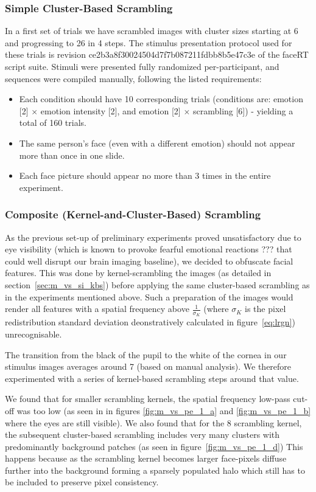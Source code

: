	    \subsubsection{Simple Cluster-Based Scrambling}
	    In a first set of trials we have scrambled images with cluster sizes starting at \SI{6}{\pixel} and progressing to \SI{26}{\pixel} in \SI{4}{\pixel} steps.
	    The stimulus presentation protocol used for these trials is revision \textcolor{lg}{ce2b3a8f30024504d7f7b087211fdbb8b5e47c3e} of the faceRT\cite{faceRT} script suite.
	    Stimuli were presented fully randomized per-participant, and sequences were compiled manually, following the listed requirements:
	    \begin{itemize}
		\item Each condition should have 10 corresponding trials (conditions are: emotion [2] $\times$ emotion intensity [2], and emotion [2] $\times$ scrambling [6]) - yielding a total of 160 trials.
		\item The same person's face (even with a different emotion) should not appear more than once in one slide.
		\item Each face picture should appear no more than 3 times in the entire experiment.
	    \end{itemize}
	    \subsubsection{Composite (Kernel-and-Cluster-Based) Scrambling}
	    As the previous set-up of preliminary experiments proved unsatisfactory due to eye visibility (which is known to provoke fearful emotional reactions ??? that could well disrupt our brain imaging baseline), we decided to obfuscate facial features.
	    This was done by kernel-scrambling the images (as detailed in section~\ref{sec:m_vs_si_kbs}) before applying the same cluster-based scrambling as in the experiments mentioned above.
	    Such a preparation of the images would render all features with a spatial frequency above $\frac{1}{\sigma_{K}}$ (where $\sigma_{K}$ is the pixel redistribution standard deviation deonstratively calculated in figure~\ref{eq:lrgn}) unrecognisable.
	    
	    The transition from the black of the pupil to the white of the cornea in our stimulus images averages around \SI{7}{\pixel} (based on manual analysis).
	    We therefore experimented with a series of kernel-based scrambling steps around that value.
	    
	    We found that for smaller scrambling kernels, the spatial frequency low-pass cut-off was too low (as seen in in figures \ref{fig:m_vs_pe_1_a} and \ref{fig:m_vs_pe_1_b} where the eyes are still visible).
	    We also found that for the \SI{8}{\pixel} scrambling kernel, the subsequent cluster-based scrambling includes very many clusters with predominantly background patches (as seen in figure~\ref{fig:m_vs_pe_1_d})
	    This happens because as the scrambling kernel becomes larger face-pixels diffuse further into the background forming a sparsely populated halo which still has to be included to preserve pixel consistency.
	    
